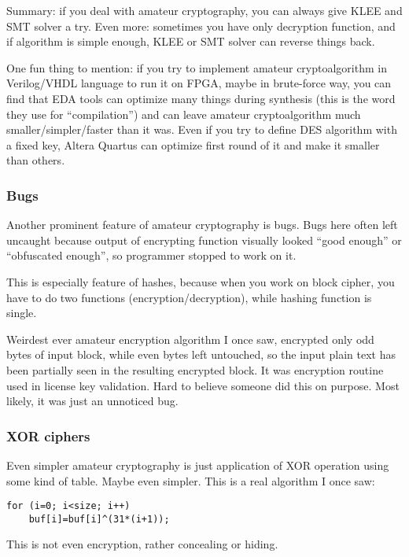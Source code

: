 Summary: if you deal with amateur cryptography, you can always give KLEE and SMT solver a try.
Even more: sometimes you have only decryption function, and if algorithm is simple enough, KLEE or SMT solver can reverse things back.

One fun thing to mention: if you try to implement amateur cryptoalgorithm in Verilog/VHDL language to run it on FPGA, maybe in brute-force way,
you can find that EDA tools can optimize many things during synthesis (this is the word they use for ``compilation'') and can leave amateur cryptoalgorithm much smaller/simpler/faster than it was.
Even if you try to define DES algorithm with a fixed key, Altera Quartus can optimize first round of it and make it smaller than others.

\subsubsection{Bugs}

Another prominent feature of amateur cryptography is bugs.
Bugs here often left uncaught because output of encrypting function visually looked ``good enough'' or ``obfuscated enough'',
so programmer stopped to work on it.

This is especially feature of hashes, because when you work on block cipher, you have to do two functions
(encryption/decryption), while hashing function is single.

Weirdest ever amateur encryption algorithm I once saw, encrypted only odd bytes of input block, while even bytes
left untouched, so the input plain text has been partially seen in the resulting encrypted block.
It was encryption routine used in license key validation.
Hard to believe someone did this on purpose.
Most likely, it was just an unnoticed bug.

\subsubsection{XOR ciphers}

Even simpler amateur cryptography is just application of XOR operation using some kind of table.
Maybe even simpler. This is a real algorithm I once saw:

\begin{lstlisting}
for (i=0; i<size; i++)
    buf[i]=buf[i]^(31*(i+1));
\end{lstlisting}

This is not even encryption, rather concealing or hiding.

